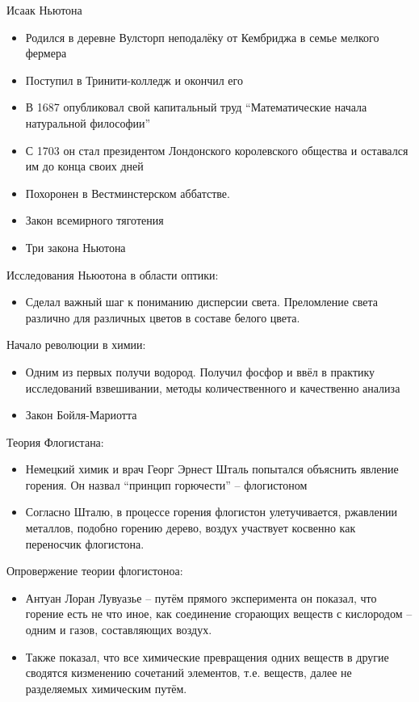 \documentclass{book}
\theoremstyle{definition}
\begin{document}
    Исаак Ньютона
    \begin{itemize}
        \item Родился в деревне Вулсторп неподалёку от Кембриджа в семье мелкого фермера
        \item Поступил в Тринити-колледж и окончил его
        \item В 1687 опубликовал свой капитальный труд ``Математические начала натуральной философии''
        \item С 1703 он стал президентом Лондонского королевского общества и оставался им до конца своих дней
        \item Похоронен в Вестминстерском аббатстве.
        \item Закон всемирного тяготения
        \item Три закона Ньютона
    \end{itemize}

    Исследования Ньюотона в области оптики:
    \begin{itemize}
        \item  Сделал важный шаг к пониманию дисперсии света. Преломление света различно для различных цветов в составе белого цвета.
    \end{itemize}

    Начало революции в химии:
    \begin{itemize}
        \item Одним из первых получи водород. Получил фосфор и ввёл в практику исследований взвешивании, методы количественного  и качественно анализа
        \item Закон Бойля-Мариотта
    \end{itemize}

    Теория Флогистана:
    \begin{itemize}
        \item Немецкий химик и врач Георг Эрнест Шталь попытался объяснить явление горения. Он назвал ``принцип горючести'' -- флогистоном
        \item Согласно Шталю, в процессе горения флогистон улетучивается, ржавлении металлов, подобно горению дерево, воздух участвует косвенно как переносчик флогистона.
    \end{itemize}

    Опровержение теории флогистоноа:
    \begin{itemize}
        \item  Антуан Лоран Лувуазье -- путём прямого эксперимента он показал, что горение есть не что иное, как соединение сгорающих веществ с кислородом  -- одним и газов, составляющих воздух.
        \item Также показал, что все химические превращения одних веществ в другие сводятся кизменению сочетаний элементов, т.е. веществ, далее не разделяемых химическим путём.
    \end{itemize}
\end{document}
